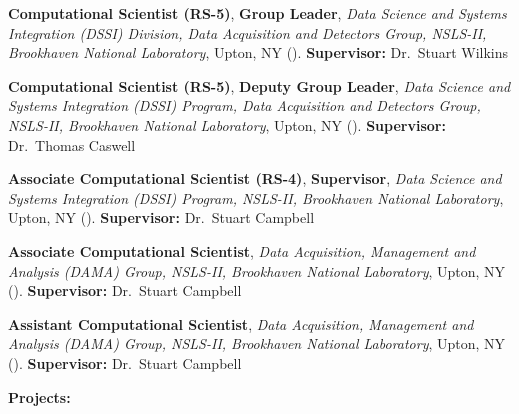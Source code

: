 
{\textbf{Computational Scientist (RS-5)}, \textbf{Group Leader},
\textit{Data Science and Systems Integration (DSSI) Division, Data Acquisition
and Detectors Group, NSLS-II, Brookhaven National Laboratory},
Upton, NY ().
\newline
\textbf{Supervisor:} Dr.~Stuart Wilkins}

{\textbf{Computational Scientist (RS-5)}, \textbf{Deputy Group Leader},
\textit{Data Science and Systems Integration (DSSI) Program, Data Acquisition
and Detectors Group, NSLS-II, Brookhaven National Laboratory},
Upton, NY ().
\newline
\textbf{Supervisor:} Dr.~Thomas Caswell}

{\textbf{Associate Computational Scientist (RS-4)}, \textbf{Supervisor},
\textit{Data Science and Systems Integration (DSSI)
Program, NSLS-II, Brookhaven National Laboratory},
Upton, NY ().
\newline
\textbf{Supervisor:} Dr.~Stuart Campbell}

{\textbf{Associate Computational Scientist},
\textit{Data Acquisition, Management and Analysis (DAMA) Group, NSLS-II,
Brookhaven National Laboratory},
Upton, NY ().
\newline
\textbf{Supervisor:} Dr.~Stuart Campbell}

{\textbf{Assistant Computational Scientist},
\textit{Data Acquisition, Management and Analysis (DAMA) Group, NSLS-II,
Brookhaven National Laboratory},
Upton, NY ().
\newline
\textbf{Supervisor:} Dr.~Stuart Campbell}

\textbf{Projects:}



